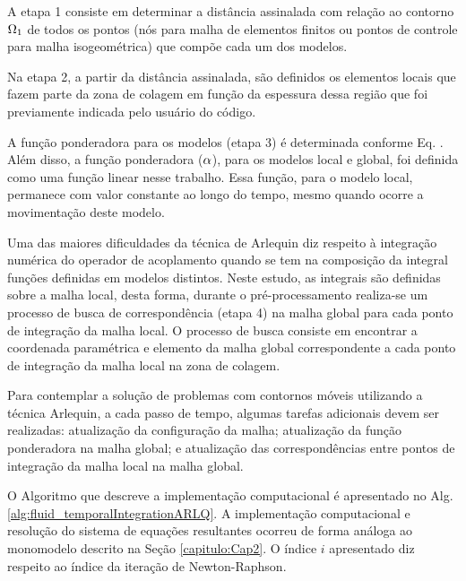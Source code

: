\documentclass[tese_patricia]{subfiles}
\begin{document}
A etapa 1 consiste em determinar a distância assinalada com relação ao contorno $\Omega_{1}$ de todos os pontos (nós para malha de elementos finitos ou pontos de controle para malha isogeométrica) que compõe cada um dos modelos.

Na etapa 2, a partir da distância assinalada, são definidos os elementos locais que fazem parte da zona de colagem em função da espessura dessa região que foi previamente indicada pelo usuário do código.

A função ponderadora para os modelos (etapa 3) é  determinada conforme Eq. . Além disso, a função ponderadora ($\alpha$), para os modelos local e global, foi definida como uma função linear nesse trabalho. Essa função, para o modelo local, permanece com valor constante ao longo do tempo, mesmo quando ocorre a movimentação deste modelo.

Uma das maiores dificuldades da técnica de Arlequin diz respeito à integração numérica do operador de acoplamento quando se tem na composição da integral funções definidas em modelos distintos. Neste estudo, as integrais são definidas sobre a malha local, desta forma, durante o pré-processamento realiza-se um processo de busca de correspondência (etapa 4) na malha global para cada ponto de integração da malha local. O processo de busca consiste em encontrar a coordenada paramétrica e elemento da malha global correspondente a cada ponto de integração da malha local na zona de colagem.

Para contemplar a solução de problemas com contornos móveis utilizando a técnica Arlequin, a cada passo de tempo, algumas tarefas adicionais devem ser realizadas: atualização da configuração da malha; atualização da função ponderadora na malha global; e atualização das correspondências entre pontos de integração da malha local na malha global.

O Algoritmo que descreve a implementação computacional é apresentado no Alg. \ref{alg:fluid_temporalIntegrationARLQ}. A implementação computacional e resolução do sistema de equações resultantes ocorreu de forma análoga ao monomodelo descrito na Seção \ref{capitulo:Cap2}. O índice $i$ apresentado diz respeito ao índice da iteração de Newton-Raphson.
\end{document}

